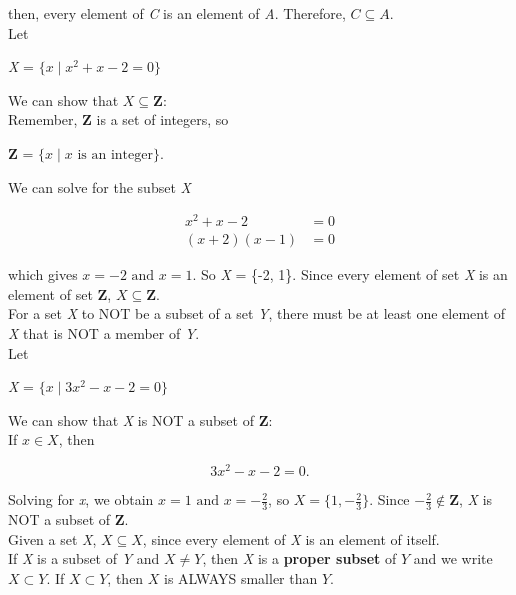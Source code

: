 then, every element of \textit{C} is an element of \textit{A}.  Therefore, $C \subseteq A$.\\

Let

\begin{center}
\textit{X} = $\{x \mid x^2 + x - 2 = 0 \}$
\end{center}

We can show that $X \subseteq \textbf{Z}$:\\

Remember, \textbf{Z} is a set of integers, so

\begin{center}
    \textbf{Z} = $\{x \mid x \text{ is an integer}\}$.
\end{center}

We can solve for the subset \textit{X}

\begin{align*}
x^2 + x - 2 &= 0\\
(x+2)(x-1) &= 0
\end{align*}

which gives $x = -2 \text{ and } x = 1$. So \textit{X} = \{-2, 1\}.  Since every element of set \textit{X} is an element of set \textbf{Z}, $X \subseteq \textbf{Z}$.\\

For a set \textit{X} to NOT be a subset of a set \textit{Y}, there must be at least one element of \textit{X} that is NOT a member of \textit{Y}.\\

Let

\begin{center}
\textit{X} = $\{x \mid 3x^2 - x - 2 = 0 \}$
\end{center}

We can show that \textit{X} is NOT a subset of \textbf{Z}:\\

If $x \in X$, then

\[
    3x^2 - x - 2 = 0.
\]

Solving for \textit{x}, we obtain $x = 1 \text{ and } x = -\frac{2}{3}$, so $X = \{1, -\frac{2}{3}\}$.  Since $-\frac{2}{3} \not\in \textbf{Z}$, \textit{X} is NOT a subset of \textbf{Z}.\\

Given a set \textit{X}, $X \subseteq X$, since every element of \textit{X} is an element of itself.\\

If \textit{X} is a subset of \textit{Y} and $X \neq Y$, then \textit{X} is a \textbf{proper subset} of $Y$ and we write $X \subset Y$.  If $X \subset Y$, then $X$ is ALWAYS smaller than $Y$.\\

